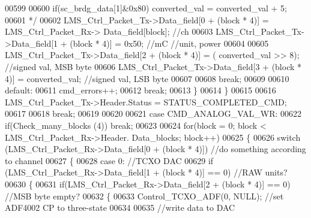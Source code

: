 \begin{DoxyCode}
00599 \textcolor{comment}{}
00600 \textcolor{comment}{                                if(sc\_brdg\_data[1]&0x80) converted\_val = converted\_val + 5;}
00601 \textcolor{comment}{*/}
00602                                 LMS\_Ctrl\_Packet\_Tx->Data_field[0 + (block * 4)] = LMS\_Ctrl\_Packet\_Rx->
      Data_field[block]; \textcolor{comment}{//ch}
00603                                 LMS\_Ctrl\_Packet\_Tx->Data_field[1 + (block * 4)] = 0x50; \textcolor{comment}{//mC //unit, power}
00604 
00605                                 LMS\_Ctrl\_Packet\_Tx->Data_field[2 + (block * 4)] = (
      converted_val >> 8); \textcolor{comment}{//signed val, MSB byte}
00606                                 LMS\_Ctrl\_Packet\_Tx->Data_field[3 + (block * 4)] = 
      converted_val; \textcolor{comment}{//signed val, LSB byte}
00607 
00608                             \textcolor{keywordflow}{break};
00609 
00610                             \textcolor{keywordflow}{default}:
00611                                 cmd_errors++;
00612                             \textcolor{keywordflow}{break};
00613                         \}
00614                     \}
00615 
00616                     LMS\_Ctrl\_Packet\_Tx->Header.Status = STATUS_COMPLETED_CMD;
00617 
00618                 \textcolor{keywordflow}{break};
00619 
00620 
00621                 \textcolor{keywordflow}{case} CMD_ANALOG_VAL_WR:
00622                     \textcolor{keywordflow}{if}(Check_many_blocks (4)) \textcolor{keywordflow}{break};
00623 
00624                     \textcolor{keywordflow}{for}(block = 0; block < LMS\_Ctrl\_Packet\_Rx->Header.
      Data_blocks; block++)
00625                     \{
00626                         \textcolor{keywordflow}{switch} (LMS\_Ctrl\_Packet\_Rx->Data_field[0 + (block * 4)]) \textcolor{comment}{//do something according
       to channel}
00627                         \{
00628                             \textcolor{keywordflow}{case} 0: \textcolor{comment}{//TCXO DAC}
00629                                 \textcolor{keywordflow}{if} (LMS\_Ctrl\_Packet\_Rx->Data_field[1 + (block * 4)] == 0) \textcolor{comment}{//RAW units?}
00630                                 \{
00631                                     \textcolor{keywordflow}{if}(LMS\_Ctrl\_Packet\_Rx->Data_field[2 + (block * 4)] == 0) \textcolor{comment}{//MSB byte
       empty?}
00632                                     \{
00633                                         Control_TCXO_ADF(0, NULL); \textcolor{comment}{//set ADF4002 CP to three-state}
00634 
00635                                         \textcolor{comment}{//write data to DAC}

\end{DoxyCode}

